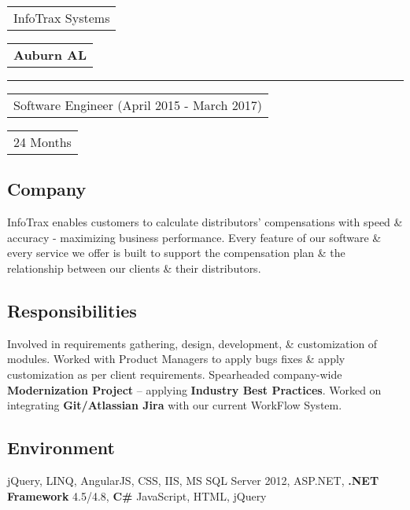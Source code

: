 \documentclass[letterpaper,11pt]{article}
\begin{document}
    \pagebreak


    \vspace{1.27cm}
    \noindent
    \begin{tabular}[t]{@{}l}
    \Large{InfoTrax Systems}
    \end{tabular}
    \hfill
    \begin{tabular}[t]{l@{}}
    \textbf{Auburn AL}
    \end{tabular}
    \noindent\rule{\textwidth}{0.5pt}
    \begin{tabular}[t]{@{}l}
    Software Engineer (April 2015 - March 2017)
    \end{tabular}
    \hfill
    \begin{tabular}[t]{l@{}}
    24 Months
    \end{tabular}

    \subsection{Company}
    InfoTrax enables customers to calculate distributors’ compensations with speed \& accuracy - maximizing business performance. Every feature of our software \& every service we offer is built to support the compensation plan \& the relationship between our clients \& their distributors.

    \subsection{Responsibilities}
    Involved in requirements gathering, design, development, \& customization of modules. Worked with Product Managers to apply bugs fixes \& apply customization as per client requirements. Spearheaded company-wide \textbf{Modernization Project} – applying \textbf{Industry Best Practices}. Worked on integrating \textbf{Git/Atlassian Jira} with our current WorkFlow System.

    \subsection{Environment}
    jQuery, LINQ, AngularJS, CSS, IIS, MS SQL Server 2012, ASP.NET, \textbf{.NET Framework} 4.5/4.8, \textbf{C\#} JavaScript, HTML, jQuery
    

\end{document}
